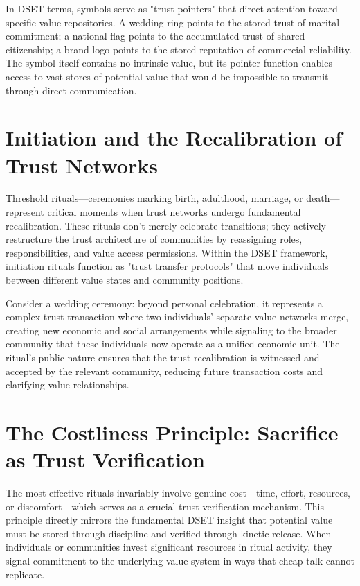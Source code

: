 \documentclass[11pt,oneside]{book}
\begin{document}
In DSET terms, symbols serve as "trust pointers" that direct attention toward specific value repositories. A wedding ring points to the stored trust of marital commitment; a national flag points to the accumulated trust of shared citizenship; a brand logo points to the stored reputation of commercial reliability. The symbol itself contains no intrinsic value, but its pointer function enables access to vast stores of potential value that would be impossible to transmit through direct communication.

\section{Initiation and the Recalibration of Trust Networks}

Threshold rituals—ceremonies marking birth, adulthood, marriage, or death—represent critical moments when trust networks undergo fundamental recalibration. These rituals don't merely celebrate transitions; they actively restructure the trust architecture of communities by reassigning roles, responsibilities, and value access permissions. Within the DSET framework, initiation rituals function as "trust transfer protocols" that move individuals between different value states and community positions.

Consider a wedding ceremony: beyond personal celebration, it represents a complex trust transaction where two individuals' separate value networks merge, creating new economic and social arrangements while signaling to the broader community that these individuals now operate as a unified economic unit. The ritual's public nature ensures that the trust recalibration is witnessed and accepted by the relevant community, reducing future transaction costs and clarifying value relationships.
\section{The Costliness Principle: Sacrifice as Trust Verification}

The most effective rituals invariably involve genuine cost—time, effort, resources, or discomfort—which serves as a crucial trust verification mechanism. This principle directly mirrors the fundamental DSET insight that potential value must be stored through discipline and verified through kinetic release. When individuals or communities invest significant resources in ritual activity, they signal commitment to the underlying value system in ways that cheap talk cannot replicate.
\end{document}

